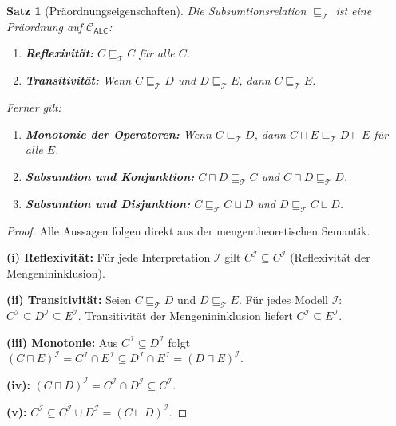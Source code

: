 ﻿\documentclass[a4paper,12pt]{article}
\theoremstyle{definition}
\theoremstyle{plain}
\newtheorem{satz}{Satz}[section]
\theoremstyle{remark}
\newcommand{\Tbox}{\ensuremath{\mathcal{T}}}
\newcommand{\interp}[1]{\ensuremath{\mathcal{#1}}}
\begin{document}
\begin{satz}[Pr{\"{a}}ordnungseigenschaften]
\label{satz:praeordnung}
Die Subsumtionsrelation $\sqsubseteq_\Tbox$ ist eine Pr{\"{a}}ordnung
auf $\mathcal{C}_{\textsf{ALC}}$:
\begin{enumerate}[label=(\roman*)]
  \item \textbf{Reflexivit{\"{a}}t:} $C \sqsubseteq_\Tbox C$ f{\"{u}}r alle $C$.
  \item \textbf{Transitivit{\"{a}}t:} Wenn $C \sqsubseteq_\Tbox D$
        und $D \sqsubseteq_\Tbox E$, dann $C \sqsubseteq_\Tbox E$.
\end{enumerate}
Ferner gilt:
\begin{enumerate}[label=(\roman*), resume]
  \item \textbf{Monotonie der Operatoren:} Wenn $C \sqsubseteq_\Tbox D$,
        dann $C \sqcap E \sqsubseteq_\Tbox D \sqcap E$ f{\"{u}}r alle $E$.
  \item \textbf{Subsumtion und Konjunktion:}
        $C \sqcap D \sqsubseteq_\Tbox C$ und
        $C \sqcap D \sqsubseteq_\Tbox D$.
  \item \textbf{Subsumtion und Disjunktion:}
        $C \sqsubseteq_\Tbox C \sqcup D$ und
        $D \sqsubseteq_\Tbox C \sqcup D$.
\end{enumerate}
\end{satz}

\begin{proof}
Alle Aussagen folgen direkt aus der mengentheoretischen Semantik.

\textbf{(i) Reflexivit{\"{a}}t:}
F{\"{u}}r jede Interpretation $\interp{I}$ gilt $C^\interp{I} \subseteq C^\interp{I}$
(Reflexivit{\"{a}}t der Mengenininklusion).

\textbf{(ii) Transitivit{\"{a}}t:}
Seien $C \sqsubseteq_\Tbox D$ und $D \sqsubseteq_\Tbox E$.
F{\"{u}}r jedes Modell $\interp{I}$:
$C^\interp{I} \subseteq D^\interp{I} \subseteq E^\interp{I}$.
Transitivit{\"{a}}t der Mengenininklusion liefert $C^\interp{I} \subseteq E^\interp{I}$.

\textbf{(iii) Monotonie:}
Aus $C^\interp{I} \subseteq D^\interp{I}$ folgt
$(C \sqcap E)^\interp{I} = C^\interp{I} \cap E^\interp{I}
\subseteq D^\interp{I} \cap E^\interp{I}
= (D \sqcap E)^\interp{I}$.

\textbf{(iv):} $(C \sqcap D)^\interp{I} = C^\interp{I} \cap D^\interp{I} \subseteq C^\interp{I}$.

\textbf{(v):} $C^\interp{I} \subseteq C^\interp{I} \cup D^\interp{I} = (C \sqcup D)^\interp{I}$.
\qedhere
\end{proof}
\end{document}
